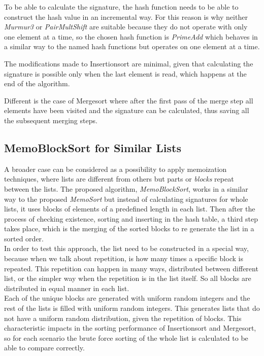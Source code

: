 \documentclass[a4paper,12pt]{article}
\begin{document}
To be able to calculate the signature, the hash function needs to be able to construct the hash value in an incremental way. For this reason is why neither {\it Murmur3} or {\it PairMultShift}  are suitable because they do not operate with only one element at a time, so the chosen hash function is {\it PrimeAdd} which behaves in a similar way to the named hash functions but operates on one element at a time.

The modifications made to Insertionsort are minimal, given that calculating the signature is possible only when the last element is read, which happens at the end of the algorithm.

Different is the case of Mergesort where after the first pass of the merge step all elements have been visited and the signature can be calculated, thus saving all the subsequent merging steps.

\subsection{MemoBlockSort for Similar Lists} \label{MemoBlockSort}
A broader case can be considered as a possibility to apply memoization techniques, where lists are different from others but parts or {\it blocks} repeat between the lists. The proposed algorithm, {\it MemoBlockSort}, works in a similar way to the proposed  {\it MemoSort} but instead of calculating signatures for whole lists, it uses blocks of elements of a predefined length in each list. Then after the process of checking existence, sorting and inserting in the hash table, a third step takes place, which is the merging of the sorted blocks to re generate the list in a sorted order.\\

In order to test this approach, the list need to be constructed in a special way, because when we talk about repetition, is how many times a specific block is repeated. This repetition can happen in many ways, distributed between different list, or the simpler way when the repetition is in the list itself. So all blocks are distributed in equal manner in each list.\\

Each of the unique blocks are generated with uniform random integers and the rest of the lists is filled with uniform random integers. This generates lists that do not have a uniform random distribution, given the repetition of blocks. This characteristic impacts in the sorting performance of Insertionsort and Mergesort, so for each scenario the brute force sorting of the whole list is calculated to be able to compare correctly. 
\end{document}
